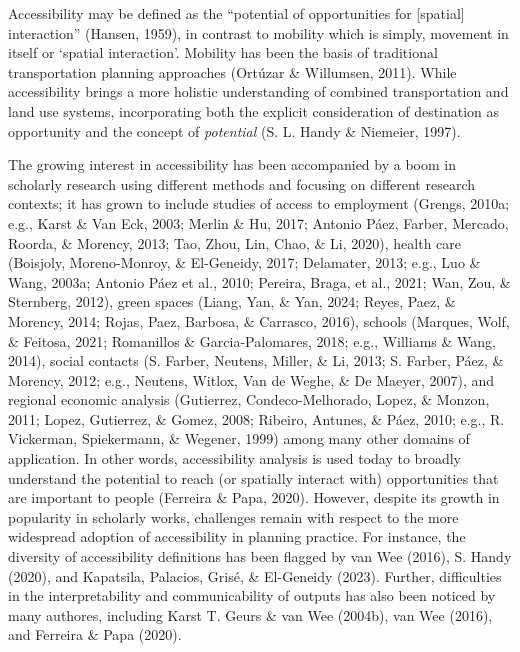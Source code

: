 \documentclass[
11pt, %
oneside, %
english, %
singlespacing, %
]{macthesis} %
\begin{document}
Accessibility may be defined as the ``potential of opportunities for {[}spatial{]} interaction'' (Hansen, 1959), in contrast to mobility which is simply, movement in itself or `spatial interaction'. Mobility has been the basis of traditional transportation planning approaches (Ortúzar \& Willumsen, 2011). While accessibility brings a more holistic understanding of combined transportation and land use systems, incorporating both the explicit consideration of destination as opportunity and the concept of \emph{potential} (S. L. Handy \& Niemeier, 1997).

The growing interest in accessibility has been accompanied by a boom in scholarly research using different methods and focusing on different research contexts; it has grown to include studies of access to employment (Grengs, 2010a; e.g., Karst \& Van Eck, 2003; Merlin \& Hu, 2017; Antonio Páez, Farber, Mercado, Roorda, \& Morency, 2013; Tao, Zhou, Lin, Chao, \& Li, 2020), health care (Boisjoly, Moreno-Monroy, \& El-Geneidy, 2017; Delamater, 2013; e.g., Luo \& Wang, 2003a; Antonio Páez et al., 2010; Pereira, Braga, et al., 2021; Wan, Zou, \& Sternberg, 2012), green spaces (Liang, Yan, \& Yan, 2024; Reyes, Paez, \& Morency, 2014; Rojas, Paez, Barbosa, \& Carrasco, 2016), schools (Marques, Wolf, \& Feitosa, 2021; Romanillos \& Garcia-Palomares, 2018; e.g., Williams \& Wang, 2014), social contacts (S. Farber, Neutens, Miller, \& Li, 2013; S. Farber, Páez, \& Morency, 2012; e.g., Neutens, Witlox, Van de Weghe, \& De Maeyer, 2007), and regional economic analysis (Gutierrez, Condeco-Melhorado, Lopez, \& Monzon, 2011; Lopez, Gutierrez, \& Gomez, 2008; Ribeiro, Antunes, \& Páez, 2010; e.g., R. Vickerman, Spiekermann, \& Wegener, 1999) among many other domains of application. In other words, accessibility analysis is used today to broadly understand the potential to reach (or spatially interact with) opportunities that are important to people (Ferreira \& Papa, 2020). However, despite its growth in popularity in scholarly works, challenges remain with respect to the more widespread adoption of accessibility in planning practice. For instance, the diversity of accessibility definitions has been flagged by van Wee (2016), S. Handy (2020), and Kapatsila, Palacios, Grisé, \& El-Geneidy (2023). Further, difficulties in the interpretability and communicability of outputs has also been noticed by many authores, including Karst T. Geurs \& van Wee (2004b), van Wee (2016), and Ferreira \& Papa (2020).
\end{document}
